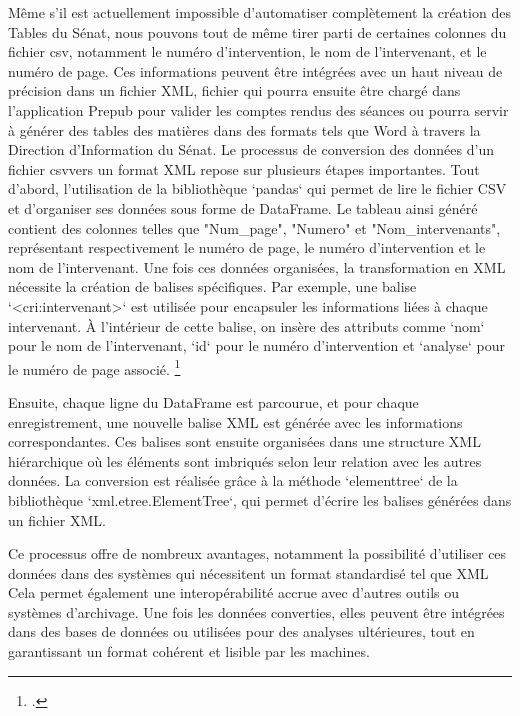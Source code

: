 Même s'il est actuellement impossible d'automatiser complètement la création des Tables du Sénat, nous pouvons tout de même tirer parti de certaines colonnes du fichier \gls{csv}, notamment le numéro d'intervention, le nom de l'intervenant, et le numéro de page. Ces informations peuvent être intégrées avec un haut niveau de précision dans un fichier \gls{XML}, fichier qui pourra ensuite être chargé dans l'application \gls{Prepub} pour valider les comptes rendus des séances ou pourra servir à générer des tables des matières dans des formats tels que Word à travers la Direction d'Information du Sénat.
Le processus de conversion des données d'un fichier \gls{csv}vers un format \gls{XML} repose sur plusieurs étapes importantes. Tout d'abord, l'utilisation de la bibliothèque `\gls{pandas}` qui permet de lire le fichier CSV et d'organiser ses données sous forme de DataFrame. Le tableau ainsi généré contient des colonnes telles que "Num\_page", "Numero" et "Nom\_intervenants", représentant respectivement le numéro de page, le numéro d'intervention et le nom de l'intervenant. Une fois ces données organisées, la transformation en \gls{XML} nécessite la création de balises spécifiques. Par exemple, une balise `<cri:intervenant>` est utilisée pour encapsuler les informations liées à chaque intervenant. À l'intérieur de cette balise, on insère des attributs comme `nom` pour le nom de l'intervenant, `id` pour le numéro d'intervention et `analyse` pour le numéro de page associé. \footcite{askpython_csv_to_xml}

Ensuite, chaque ligne du DataFrame est parcourue, et pour chaque enregistrement, une nouvelle balise \gls{XML} est générée avec les informations correspondantes. Ces balises sont ensuite organisées dans une structure \gls{XML} hiérarchique où les éléments sont imbriqués selon leur relation avec les autres données. La conversion est réalisée grâce à la méthode `\gls{elementtree}` de la bibliothèque `xml.etree.ElementTree`, qui permet d'écrire les balises générées dans un fichier \gls{XML}.

Ce processus offre de nombreux avantages, notamment la possibilité d'utiliser ces données dans des systèmes qui nécessitent un format standardisé tel que \gls{XML} Cela permet également une interopérabilité accrue avec d'autres outils ou systèmes d'archivage. Une fois les données converties, elles peuvent être intégrées dans des bases de données ou utilisées pour des analyses ultérieures, tout en garantissant un format cohérent et lisible par les machines.


